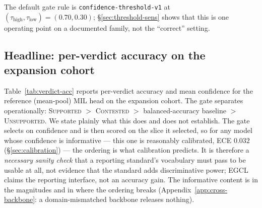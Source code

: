 \documentclass{article}
\newcommand{\SafeNum}[1]{#1}
\begin{document}
The default gate rule is \texttt{confidence-threshold-v1} at $(\tau_{\text{high}}, \tau_{\text{low}}) = (\SafeNum{0.70}, \SafeNum{0.30})$; \S\ref{sec:threshold-sens} shows that this is one operating point on a documented family, not the ``correct'' setting.

\subsection{Headline: per-verdict accuracy on the expansion cohort}
\label{sec:headline}

Table~\ref{tab:verdict-acc} reports per-verdict accuracy and mean confidence for the reference (mean-pool) MIL head on the expansion cohort. The gate separates operationally: \textsc{Supported} $>$ \textsc{Contested} $>$ balanced-accuracy baseline $>$ \textsc{Unsupported}. We state plainly what this does and does not establish. The gate selects on confidence and is then scored on the slice it selected, so for any model whose confidence is informative --- this one is reasonably calibrated, ECE $\SafeNum{0.032}$ (\S\ref{sec:calibration}) --- the ordering is what calibration predicts. It is therefore a \emph{necessary sanity check} that a reporting standard's vocabulary must pass to be usable at all, not evidence that the standard adds discriminative power; EGCL claims the reporting interface, not an accuracy gain. The informative content is in the magnitudes and in where the ordering breaks (Appendix~\ref{app:cross-backbone}: a domain-mismatched backbone releases nothing).
\end{document}
